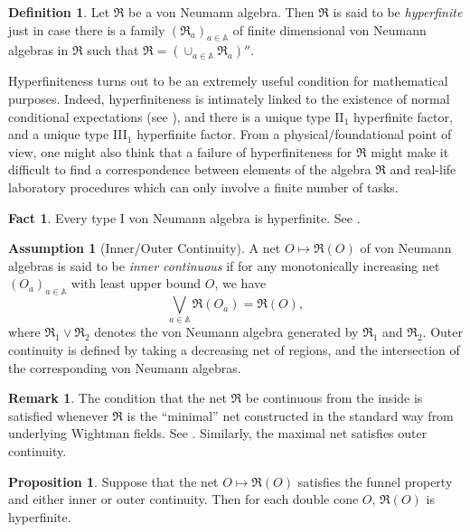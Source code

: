 \documentclass[11pt]{article}
\newcommand{\alg}[1]{\mathfrak{#1}}
\theoremstyle{definition}
\newtheorem{assumption}{Assumption}
\newtheorem{fact}[thm]{Fact}
\newtheorem{prop}[thm]{Proposition}
\theoremstyle{definition}
\newtheorem{defn}[thm]{Definition}
\newtheorem{note}[thm]{Remark}
\theoremstyle{remark}
\def\7#1{{\mathbb #1}}
\def\al#1{{\mathfrak #1}}
\begin{document}
\begin{defn} Let $\alg{R}$ be a von Neumann algebra.  Then $\alg{R}$ is said to be
  \emph{hyperfinite} just in case there is a family $(\alg{R}_a)_{a\in \7A}$ of
  finite dimensional von Neumann algebras in $\alg{R}$ such that $\alg{R}=(\cup
  _{a\in \7A }\alg{R}_a)''$.  \end{defn}

Hyperfiniteness turns out to be an extremely useful condition for mathematical
purposes.  Indeed, hyperfiniteness is intimately linked to the existence of normal
conditional expectations (see \cite[Chap.\ 8]{kr}), and there is a unique type II$_1$
hyperfinite factor, and a unique type III$_1$ hyperfinite factor.  From a
physical/foundational point of view, one might also think that a failure of
hyperfiniteness for $\alg{R}$ might make it difficult to find a correspondence between
elements of the algebra $\alg{R}$ and real-life laboratory procedures which can only
involve a finite number of tasks.

\begin{fact} Every type I von Neumann algebra is hyperfinite.  See \cite[Exercise
  8.7.26]{kr}.
\end{fact}

\begin{assumption}[Inner/Outer Continuity] A net $O\mapsto \al R(O)$
  of von Neumann algebras is said to be \emph{inner continuous} if for
  any monotonically increasing net $(O_{a})_{a\in \7A}$ with least
  upper bound $O$, we have
$$ \bigvee _{a\in \7A } \al R(O_a) = \al R(O) ,$$ 
where $\al R_1\vee \al R_2$ denotes the von Neumann algebra generated
by $\al R_1$ and $\al R_2$.  Outer continuity is defined by taking a
decreasing net of regions, and the intersection of the corresponding
von Neumann algebras.  \end{assumption}

\begin{note} The condition that the net $\al R$ be continuous from the
  inside is satisfied whenever $\al R$ is the ``minimal'' net
  constructed in the standard way from underlying Wightman fields.
  See \cite{typeIII}.  Similarly, the maximal net satisfies outer
  continuity.
\end{note}

\begin{prop} Suppose that the net $O\mapsto \al R(O)$
  satisfies the funnel property and either inner or outer continuity.
  Then for each double cone $O$, $\al R(O)$ is hyperfinite.
\end{prop}
\end{document}
